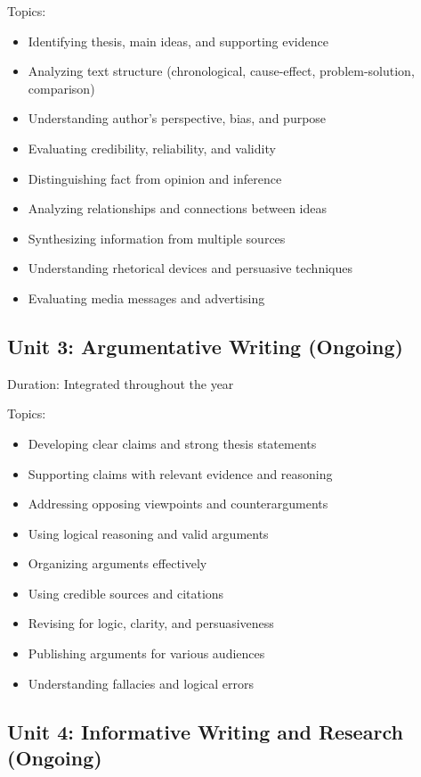 \documentclass[11pt,letterpaper]{report}
\begin{document}
Topics:
\begin{itemize}
\item Identifying thesis, main ideas, and supporting evidence
\item Analyzing text structure (chronological, cause-effect, problem-solution, comparison)
\item Understanding author's perspective, bias, and purpose
\item Evaluating credibility, reliability, and validity
\item Distinguishing fact from opinion and inference
\item Analyzing relationships and connections between ideas
\item Synthesizing information from multiple sources
\item Understanding rhetorical devices and persuasive techniques
\item Evaluating media messages and advertising
\end{itemize}

\subsection{Unit 3: Argumentative Writing (Ongoing)}

Duration: Integrated throughout the year

Topics:
\begin{itemize}
\item Developing clear claims and strong thesis statements
\item Supporting claims with relevant evidence and reasoning
\item Addressing opposing viewpoints and counterarguments
\item Using logical reasoning and valid arguments
\item Organizing arguments effectively
\item Using credible sources and citations
\item Revising for logic, clarity, and persuasiveness
\item Publishing arguments for various audiences
\item Understanding fallacies and logical errors
\end{itemize}

\subsection{Unit 4: Informative Writing and Research (Ongoing)}
\end{document}
